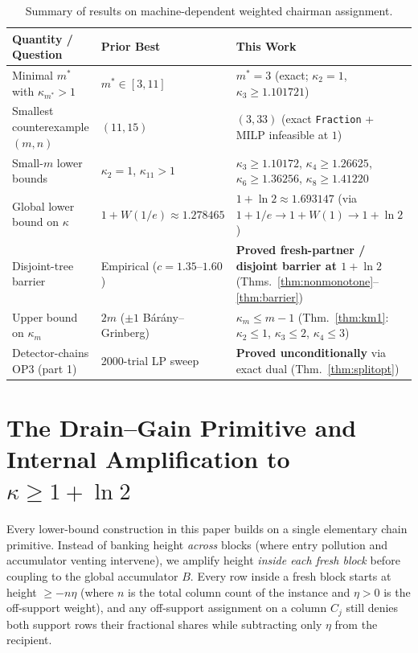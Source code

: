 \documentclass[11pt]{article}
\theoremstyle{definition}
\newcommand{\W}{W}
\begin{document}
\begin{table}[t]
\centering
\small
\begin{tabular}{@{}lll@{}}
\toprule
Quantity / Question & Prior Best & This Work \\
\midrule
Minimal $m^*$ with $\kappa_{m^*}>1$ & $m^*\in[3,11]$ & \textbf{$m^*=3$} (exact; $\kappa_2=1$, $\kappa_3\ge 1.101721$) \\
Smallest counterexample $(m,n)$ & $(11,15)$ & \textbf{$(3,33)$} (exact \texttt{Fraction} + MILP infeasible at $1$) \\
Small-$m$ lower bounds & $\kappa_2=1$, $\kappa_{11}>1$ & $\kappa_3\ge 1.10172$, $\kappa_4\ge 1.26625$, $\kappa_6\ge 1.36256$, $\kappa_8\ge 1.41220$ \\
Global lower bound on $\kappa$ & $1+\W(1/e)\approx 1.278465$ & \textbf{$1+\ln 2\approx 1.693147$} (via $1+1/e \to 1+\W(1) \to 1+\ln 2$) \\
Disjoint-tree barrier & Empirical ($c=1.35$–$1.60$) & \textbf{Proved fresh-partner / disjoint barrier at $1+\ln 2$} (Thms.~\ref{thm:nonmonotone}--\ref{thm:barrier}) \\
Upper bound on $\kappa_m$ & $2m$ ($\pm 1$ B\'ar\'any--Grinberg) & \textbf{$\kappa_m\le m-1$} (Thm.~\ref{thm:km1}: $\kappa_2\le 1$, $\kappa_3\le 2$, $\kappa_4\le 3$) \\
Detector-chains OP3 (part 1) & 2000-trial LP sweep & \textbf{Proved unconditionally} via exact dual (Thm.~\ref{thm:splitopt}) \\
\bottomrule
\end{tabular}
\caption{Summary of results on machine-dependent weighted chairman assignment.}
\label{tab:summary}
\end{table}

\section{The Drain--Gain Primitive and Internal Amplification to $\kappa\ge 1+\ln 2$}

Every lower-bound construction in this paper builds on a single elementary chain primitive. Instead of banking height \emph{across} blocks (where entry pollution and accumulator venting intervene), we amplify height \emph{inside each fresh block} before coupling to the global accumulator $B$. Every row inside a fresh block starts at height $\ge -n\eta$ (where $n$ is the total column count of the instance and $\eta>0$ is the off-support weight), and any off-support assignment on a column $C_j$ still denies both support rows their fractional shares while subtracting only $\eta$ from the recipient.
\end{document}
